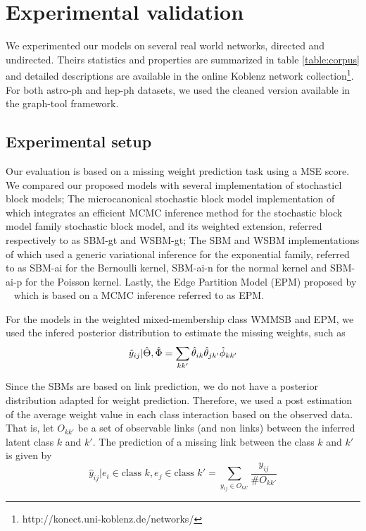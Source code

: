 \section{Experimental validation}
\label{sec:exps}

We experimented our models on several real world networks, directed and undirected. Theirs statistics and properties are summarized in table \ref{table:corpus} and detailed descriptions are available in the online Koblenz network collection\footnote{http://konect.uni-koblenz.de/networks/}. For both astro-ph and hep-ph datasets, we used the cleaned version available in the  graph-tool framework.

\begin{table*}[t]
\bgroup
\def\arraystretch{1} %
	
\egroup
\label{table:corpus}
\end{table*}

\subsection{Experimental setup}

Our evaluation is based on a missing weight prediction task using a MSE score. We compared our proposed models with several implementation of stochasticl block models; The microcanonical stochastic block model implementation of \cite{peixoto2018nonparametric} which integrates an efficient MCMC inference method for the stochastic block model family stochastic block model, and its weighted extension, referred respectively to as SBM-gt and WSBM-gt; The SBM and WSBM implementations of \cite{aicher2014learning} which used a generic variational inference for the exponential family, referred to as SBM-ai for the Bernoulli kernel, SBM-ai-n for the normal kernel and SBM-ai-p for the Poisson kernel. Lastly, the Edge Partition Model (EPM) proposed by ~\cite{zhou2015infinite} which is based on a MCMC inference referred to as EPM.

For the models in the weighted mixed-membership class WMMSB and EPM, we used the infered posterior distribution to estimate the missing weights, such as
\[
\hat y_{ij} | \hat\Theta, \hat\Phi = \sum_{kk'} \hat\theta_{ik} \hat\theta_{jk'} \hat\phi_{kk'}
\]

Since the SBMs are based on link prediction, we do not have a posterior distribution adapted for weight prediction. Therefore, we used a post estimation of the average weight value in each class interaction based on the observed data. That is, let $O_{kk'}$ be a set of observable links (and non links) between the inferred latent class $k$ and $k'$. The prediction of a missing link between the class $k$ and $k'$ is given by
\[
\hat y_{ij} | e_i \in \text{class } k, e_j \in \text{class }k' = \sum_{y_{ij} \in O_{kk'}} \frac{y_{ij}}{\# O_{kk'}}
\]


